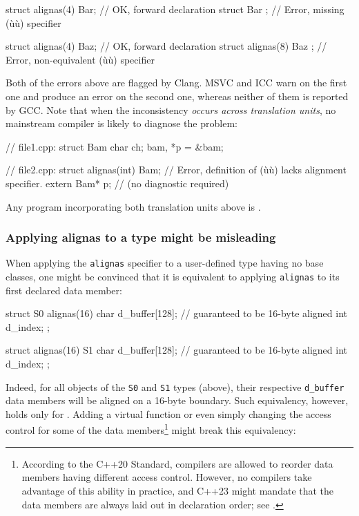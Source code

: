 \begin{emcppslisting}
struct alignas(4) Bar;      // OK, forward declaration
struct Bar { };             // Error, missing (ù{}ù) specifier

struct alignas(4) Baz;      // OK, forward declaration
struct alignas(8) Baz { };  // Error, non-equivalent (ù{}ù) specifier
\end{emcppslisting}

\noindent Both of the errors above are flagged by Clang. MSVC and ICC warn on the first one and produce an error on the second one, whereas neither of them is
reported by GCC. Note that when the inconsistency \emph{occurs across
translation units}, no mainstream compiler is likely to diagnose the
problem:

\begin{emcppslisting}
// file1.cpp:
struct Bam { char ch; } bam, *p = &bam;

// file2.cpp:
struct alignas(int) Bam;  // Error, definition of (ù{}ù) lacks alignment specifier.
extern Bam* p;            //        (no diagnostic required)
\end{emcppslisting}

\noindent Any program incorporating both translation units above is
.

\subsubsection[Applying \lstinline!alignas! to a \emph{type} might be misleading]{Applying {\SubsubsecCode alignas} to a {\sfbsubsubsecitalRomeo type} might be misleading}\label{applying-alignas-to-a-type-might-be-misleading}

When applying the \lstinline!alignas! specifier to a user-defined type having no base classes, one might be convinced that it is equivalent to applying \lstinline!alignas! to its first declared data member:

\begin{emcppslisting}
struct S0 {
    alignas(16) char d_buffer[128];  // guaranteed to be 16-byte aligned
                int  d_index;
};

struct alignas(16) S1 {
    char d_buffer[128];              // guaranteed to be 16-byte aligned
    int  d_index;
};
\end{emcppslisting}

Indeed, for all objects of the \lstinline!S0! and \lstinline!S1! types (above), their respective \lstinline!d_buffer! data members will be aligned on a 16-byte boundary. Such equivalency, however, holds only for .  Adding a virtual function or even simply changing the access control for some of the data members\footnote{According to the C++20 Standard, compilers are allowed to reorder data members having different access control.  However, no compilers take advantage of this ability in practice, and C++23 might mandate that the data members are always laid out in declaration order; see \cite{balog20}.} might break this equivalency:

